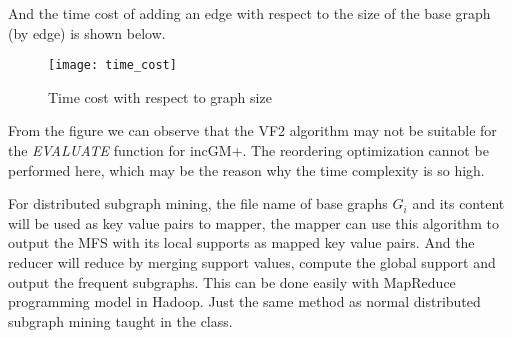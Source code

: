 \documentclass[a4paper, 12pt]{report}
\begin{document}
And the time cost of adding an edge with respect to the size of the base graph (by edge) is shown below.

\begin{figure}[H]
\centering
\texttt{[image: time\_cost]}
\caption{Time cost with respect to graph size}
\end{figure}

From the figure we can observe that the VF2 algorithm may not be suitable for the \emph{EVALUATE} function for incGM+. The reordering optimization cannot be performed here, which may be the reason why the time complexity is so high.

For distributed subgraph mining,  the file name of base graphs $G_i$ and its content will be used as key value pairs to mapper, the mapper can use this algorithm to output the MFS with its local supports as mapped key value pairs. And the reducer will reduce by merging support values, compute the global support and output the frequent subgraphs. This can be done easily with MapReduce programming model in Hadoop. Just the same method as normal distributed subgraph mining
taught in the class. 
{}

\end{document}

